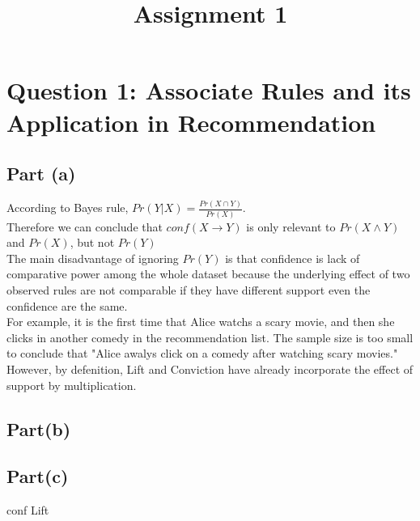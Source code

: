 \documentclass{article} %
\begin{document}
\title{Assignment 1}
\author{} %
\date{} %
\maketitle %

\section*{Question 1: Associate Rules and its Application in Recommendation} %

\subsection*{Part (a)} %

According to Bayes rule,
$Pr(Y|X) = \frac{Pr(X \cap Y)}{Pr(X)}$.\\
Therefore we can conclude that $conf(X \rightarrow Y)$
is only relevant to $Pr(X \wedge Y)$ and $Pr(X)$, but not $Pr(Y)$\\
The main disadvantage of ignoring $Pr(Y)$ is that confidence is lack of comparative power among the whole dataset
because the underlying effect of two observed rules are not comparable if they have different support even the confidence are the same.\\
For example, it is the first time that Alice watchs a scary movie, and then she clicks in another comedy in the recommendation list.
The sample size is too small to conclude that "Alice awalys click on a comedy after watching scary movies."\\
However, by defenition, Lift and Conviction have already incorporate the effect of support by multiplication.

\subsection*{Part(b)}



\subsection*{Part(c)}

conf
Lift
\end{document}
